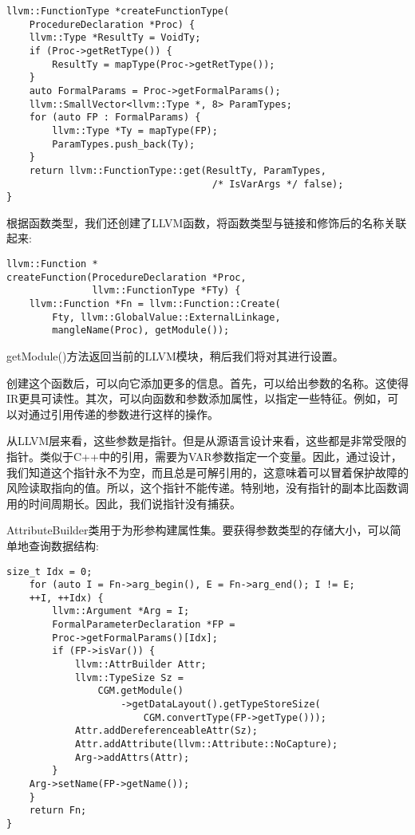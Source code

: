 \begin{lstlisting}[caption={}]
llvm::FunctionType *createFunctionType(
	ProcedureDeclaration *Proc) {
	llvm::Type *ResultTy = VoidTy;
	if (Proc->getRetType()) {
		ResultTy = mapType(Proc->getRetType());
	}
	auto FormalParams = Proc->getFormalParams();
	llvm::SmallVector<llvm::Type *, 8> ParamTypes;
	for (auto FP : FormalParams) {
		llvm::Type *Ty = mapType(FP);
		ParamTypes.push_back(Ty);
	}
	return llvm::FunctionType::get(ResultTy, ParamTypes,
									/* IsVarArgs */ false);
}
\end{lstlisting}

根据函数类型，我们还创建了LLVM函数，将函数类型与链接和修饰后的名称关联起来:\par

\begin{lstlisting}[caption={}]
llvm::Function *
createFunction(ProcedureDeclaration *Proc,
			   llvm::FunctionType *FTy) {
	llvm::Function *Fn = llvm::Function::Create(
		Fty, llvm::GlobalValue::ExternalLinkage,
		mangleName(Proc), getModule());
\end{lstlisting}

getModule()方法返回当前的LLVM模块，稍后我们将对其进行设置。\par

创建这个函数后，可以向它添加更多的信息。首先，可以给出参数的名称。这使得IR更具可读性。其次，可以向函数和参数添加属性，以指定一些特征。例如，可以对通过引用传递的参数进行这样的操作。\par

从LLVM层来看，这些参数是指针。但是从源语言设计来看，这些都是非常受限的指针。类似于C++中的引用，需要为VAR参数指定一个变量。因此，通过设计，我们知道这个指针永不为空，而且总是可解引用的，这意味着可以冒着保护故障的风险读取指向的值。所以，这个指针不能传递。特别地，没有指针的副本比函数调用的时间周期长。因此，我们说指针没有捕获。\par

AttributeBuilder类用于为形参构建属性集。要获得参数类型的存储大小，可以简单地查询数据结构:\par

\begin{lstlisting}[caption={}]
	size_t Idx = 0;
	for (auto I = Fn->arg_begin(), E = Fn->arg_end(); I != E;
	++I, ++Idx) {
		llvm::Argument *Arg = I;
		FormalParameterDeclaration *FP =
		Proc->getFormalParams()[Idx];
		if (FP->isVar()) {
			llvm::AttrBuilder Attr;
			llvm::TypeSize Sz =
				CGM.getModule()
					->getDataLayout().getTypeStoreSize(
						CGM.convertType(FP->getType()));
			Attr.addDereferenceableAttr(Sz);
			Attr.addAttribute(llvm::Attribute::NoCapture);
			Arg->addAttrs(Attr);
		}
	Arg->setName(FP->getName());
	}
	return Fn;
}
\end{lstlisting}

